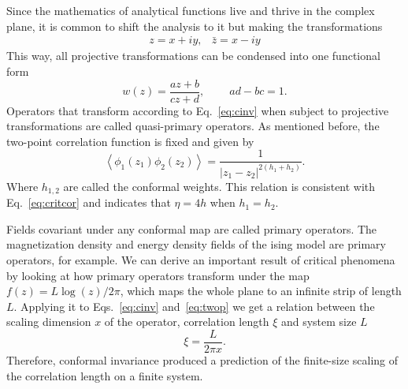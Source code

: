 Since the mathematics of analytical functions live and thrive in the complex
plane, it is common to shift the analysis to it but making the transformations
\begin{equation}
    \begin{array}{cc}
        z=x+iy, & \bar{z}=x-iy
    \end{array}
\end{equation}
This way, all projective transformations can be condensed into one functional
form
\begin{equation}
    w\left(z\right)=\frac{az+b}{cz+d},\;\;\;\;\;\;\;\; ad-bc=1.
\end{equation}
Operators that transform according to Eq.~\ref{eq:cinv} when subject to
projective transformations are called quasi-primary operators.
As mentioned before, the two-point correlation function is fixed and given by
\begin{equation}
    \label{eq:twop}
    \left\langle
        \phi_{1}\left(z_{1}\right)\phi_{2}\left(z_{2}\right)
    \right\rangle =
    \frac{1}{\left|z_{1}-z_{2}\right|^{2(h_{1}+h_{2})}}.
\end{equation}
Where $h_{1,2}$ are called the conformal weights. This relation is consistent
with Eq.~\ref{eq:critcor} and indicates that $\eta=4h$ when $h_1=h_2$.

Fields covariant under any conformal map are called primary operators. The
magnetization density and energy density fields of the ising model are primary
operators, for example. We can derive an important result of critical phenomena
by looking at how primary operators transform under the map
$f(z)=L\log(z)/2\pi$, which maps the whole plane to an infinite strip of length
$L$. Applying it to Eqs.~\ref{eq:cinv} and~\ref{eq:twop} we get a relation
between the scaling dimension $x$ of the operator, correlation length $\xi$ and
system size $L$
\begin{equation}
    \xi=\frac{L}{2\pi x}.
\end{equation}
Therefore, conformal invariance produced a prediction of the finite-size
scaling of the correlation length on a finite system.

